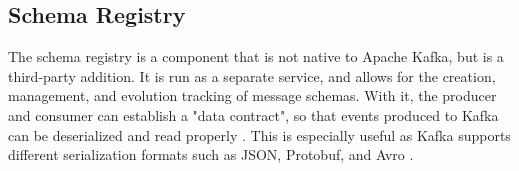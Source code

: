 
\subsection{Schema Registry}
The schema registry is a component that is not native to Apache Kafka, but is a third-party addition. It is run as a separate service, and allows for the creation, management, and evolution tracking of message schemas. With it, the producer and consumer can establish a "data contract", so that events produced to Kafka can be deserialized and read properly \cite{kreps2011kafka}. This is especially useful as Kafka supports different serialization formats such as JSON, Protobuf, and Avro \cite{kafkadocumentation}.



